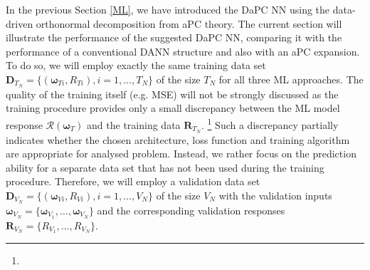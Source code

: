 \documentclass[a4paper,fleqn]{article}
\newcommand{\rw}[1]{\textcolor{blue}{#1}}
\newcommand{\del}[1]{\textcolor{red}{\sout{#1}}}
\renewcommand{\del}[1]{}
\renewcommand{\rw}[1]{#1}
\begin{document}
In the previous Section \ref{ML}, we have introduced the DaPC NN using the data-driven orthonormal decomposition from aPC theory. The current section will illustrate the performance of the suggested DaPC NN, comparing it with the performance of a conventional DANN structure and also with an aPC expansion.
To do so, we will employ exactly the same training data set $\bm{D}_{T_N}=\big\{(\bm{\omega}_{Ti},R_{Ti}), i=1,\ldots,T_N \big\}$ of the size $T_N$ for all three ML approaches. The quality of the training itself (e.g. MSE) will not be strongly discussed as the training procedure provides only a small discrepancy between the ML model response $\mathcal{R}(\bm{\omega}_T)$ and the training data $\mathbf{R}_{T_N}$. \footnote{\del{We have observed for all considered test cases, that omitting regularization in loss function only slightly degrades the results of DaPC NN and aPC, whereas the conventional DANN shows extremely poor capability. Hence, pure comparison focusing on least-square solution without regularization seems to be not attractive.}} 
\rw{Such a discrepancy partially indicates whether the chosen architecture, loss function and training algorithm are appropriate for analysed problem.} Instead, we rather focus on the prediction ability for a separate data set that has not been used during the training procedure. Therefore, we will employ a validation data set \del{(also known as test data set)} \cite{james2014intro} $\bm{D}_{V_N}=\big\{(\bm{\omega}_{Vi},R_{Vi}), i=1,\ldots,V_N \big\}$ of the size $V_N$ with the validation inputs $\bm{\omega}_{V_N}=\{\bm{\omega}_{V_1},\ldots,\bm{\omega}_{V_N} \}$ and the corresponding validation responses $\mathbf{R}_{V_N}=\{R_{V_1},\ldots,R_{V_N}\}$.
\end{document}
